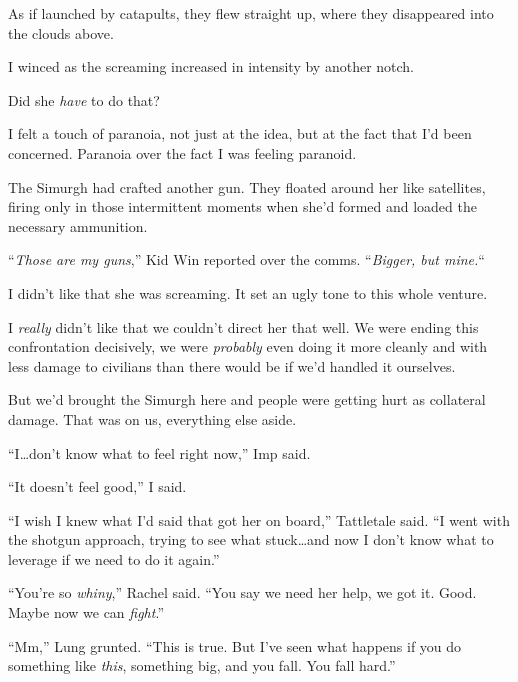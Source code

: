 As if launched by catapults, they flew straight up, where they disappeared into the clouds above.



I winced as the screaming increased in intensity by another notch.



Did she \emph{have} to do that?



I felt a touch of paranoia, not just at the idea, but at the fact that I'd been concerned.  Paranoia over the fact I was feeling paranoid.



The Simurgh had crafted another gun.  They floated around her like satellites, firing only in those intermittent moments when she'd formed and loaded the necessary ammunition.



``\emph{Those are my guns},'' Kid Win reported over the comms.  ``\emph{Bigger, but mine.}``



I didn't like that she was screaming.  It set an ugly tone to this whole venture.



I \emph{really} didn't like that we couldn't direct her that well.  We were ending this confrontation decisively, we were \emph{probably} even doing it more cleanly and with less damage to civilians than there would be if we'd handled it ourselves.



But we'd brought the Simurgh here and people were getting hurt as collateral damage.  That was on us, everything else aside.



``I\ldots don't know what to feel right now,'' Imp said.



``It doesn't feel good,'' I said.



``I wish I knew what I'd said that got her on board,'' Tattletale said.  ``I went with the shotgun approach, trying to see what stuck\ldots and now I don't know what to leverage if we need to do it again.''



``You're so \emph{whiny},'' Rachel said.  ``You say we need her help, we got it.  Good.  Maybe now we can \emph{fight}.''



``Mm,'' Lung grunted.  ``This is true.  But I've seen what happens if you do something like \emph{this}, something big, and you fall.  You fall hard.''



